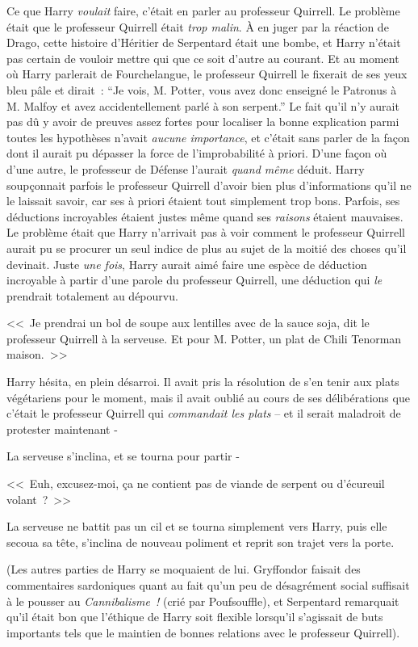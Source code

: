 Ce que Harry \emph{voulait} faire, c'était en parler au professeur Quirrell. Le problème était que le professeur Quirrell était \emph{trop malin}. À en juger par la réaction de Drago, cette histoire d'Héritier de Serpentard était une bombe, et Harry n'était pas certain de vouloir mettre qui que ce soit d'autre au courant. Et au moment où Harry parlerait de Fourchelangue, le professeur Quirrell le fixerait de ses yeux bleu pâle et dirait~: “Je vois, M. Potter, vous avez donc enseigné le Patronus à M. Malfoy et avez accidentellement parlé à son serpent.”
Le fait qu'il n'y aurait pas dû y avoir de preuves assez fortes pour localiser la bonne explication parmi toutes les hypothèses n'avait \emph{aucune importance}, et c'était sans parler de la façon dont il aurait pu dépasser la force de l'improbabilité à priori. D'une façon où d'une autre, le professeur de Défense l'aurait \emph{quand même} déduit. Harry soupçonnait parfois le professeur Quirrell d'avoir bien plus d'informations qu'il ne le laissait savoir, car ses à priori étaient tout simplement trop bons. Parfois, ses déductions incroyables étaient justes même quand ses \emph{raisons} étaient mauvaises. Le problème était que Harry n'arrivait pas à voir comment le professeur Quirrell aurait pu se procurer un seul indice de plus au sujet de la moitié des choses qu'il devinait. Juste \emph{une fois}, Harry aurait aimé faire une espèce de déduction incroyable à partir d'une parole du professeur Quirrell, une déduction qui \emph{le} prendrait totalement au dépourvu.

\later

<<~Je prendrai un bol de soupe aux lentilles avec de la sauce soja, dit le professeur Quirrell à la serveuse. Et pour M. Potter, un plat de Chili Tenorman maison.~>>

Harry hésita, en plein désarroi. Il avait pris la résolution de s'en tenir aux plats végétariens pour le moment, mais il avait oublié au cours de ses délibérations que c'était le professeur Quirrell qui \emph{commandait les plats} -- et il serait maladroit de protester maintenant -

La serveuse s'inclina, et se tourna pour partir -

<<~Euh, excusez-moi, ça ne contient pas de viande de serpent ou d'écureuil volant~?~>>

La serveuse ne battit pas un cil et se tourna simplement vers Harry, puis elle secoua sa tête, s'inclina de nouveau poliment et reprit son trajet vers la porte.

(Les autres parties de Harry se moquaient de lui. Gryffondor faisait des commentaires sardoniques quant au fait qu'un peu de désagrément social suffisait à le pousser au \emph{Cannibalisme~!} (crié par Poufsouffle), et Serpentard remarquait qu'il était bon que l'éthique de Harry soit flexible lorsqu'il s'agissait de buts importants tels que le maintien de bonnes relations avec le professeur Quirrell).

